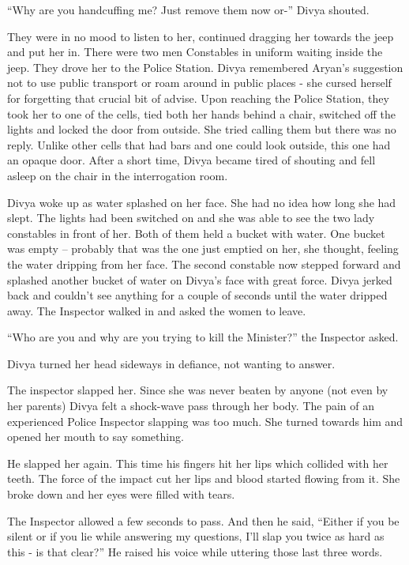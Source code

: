 “Why are you handcuffing me? Just remove them now or-” Divya shouted.

They were in no mood to listen to her, continued dragging her towards the jeep
and put her in. There were two men Constables in uniform waiting inside the
jeep. They drove her to the Police Station. Divya remembered Aryan's suggestion
not to use public transport or roam around in public places - she cursed herself
for forgetting that crucial bit of advise. Upon reaching the Police Station,
they took her to one of the cells, tied both her hands behind a chair, switched
off the lights and locked the door from outside. She tried calling them but
there was no reply. Unlike other cells that had bars and one could look outside,
this one had an opaque door. After a short time, Divya became tired of shouting
and fell asleep on the chair in the interrogation room.

Divya woke up as water splashed on her face. She had no idea how long she had
slept. The lights had been switched on and she was able to see the two lady
constables in front of her. Both of them held a bucket with water. One bucket
was empty – probably that was the one just emptied on her, she thought, feeling
the water dripping from her face. The second constable now stepped forward and
splashed another bucket of water on Divya's face with great force. Divya jerked
back and couldn't see anything for a couple of seconds until the water dripped
away. The Inspector walked in and asked the women to leave.

“Who are you and why are you trying to kill the Minister?” the Inspector asked.

Divya turned her head sideways in defiance, not wanting to answer.

The inspector slapped her. Since she was never beaten by anyone (not even by her
parents) Divya felt a shock-wave pass through her body. The pain of an
experienced Police Inspector slapping was too much. She turned towards him and
opened her mouth to say something.

He slapped her again. This time his fingers hit her lips which collided with her
teeth. The force of the impact cut her lips and blood started flowing from it.
She broke down and her eyes were filled with tears.

The Inspector allowed a few seconds to pass. And then he said, “Either if you be
silent or if you lie while answering my questions, I'll slap you twice as hard
as this - is that clear?” He raised his voice while uttering those last three
words.

